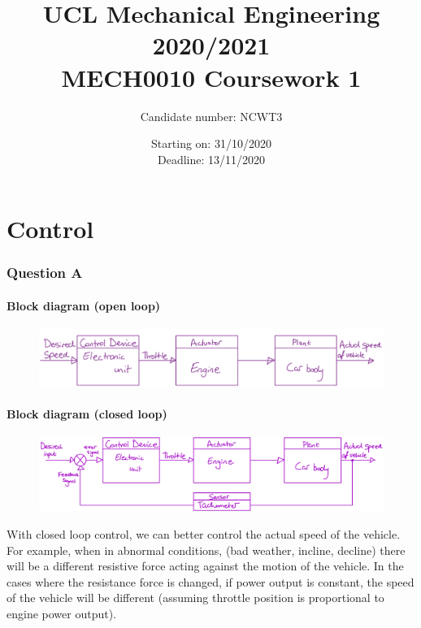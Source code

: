 \documentclass[12pt]{article}
\numberwithin{equation}{section}
\begin{document}
\title{\textbf{UCL Mechanical Engineering 2020/2021}\\MECH0010 Coursework 1}
\date{Starting on: 31/10/2020\\Deadline: 13/11/2020}
\author{Candidate number: NCWT3}
\maketitle
\tableofcontents
\newpage
\part{Control}
\section{Question A}
\subsection*{Block diagram (open loop)}
\begin{figure}[H]
  \centering
  \includegraphics[width=\textwidth]{./img/1-1blockdiagram.png}
\end{figure}
\subsection*{Block diagram (closed loop)}
\begin{figure}[H]
  \centering
  \includegraphics[width=\textwidth]{./img/1-2blockdiagram.png}
\end{figure}
With closed loop control, we can better control the actual speed of the vehicle. For example, when in abnormal conditions, (bad weather, incline, decline) there will be a different resistive force acting against the motion of the vehicle. In the cases where the resistance force is changed, if power output is constant, the speed of the vehicle will be different (assuming throttle position is proportional to engine power output). 
\end{document}
